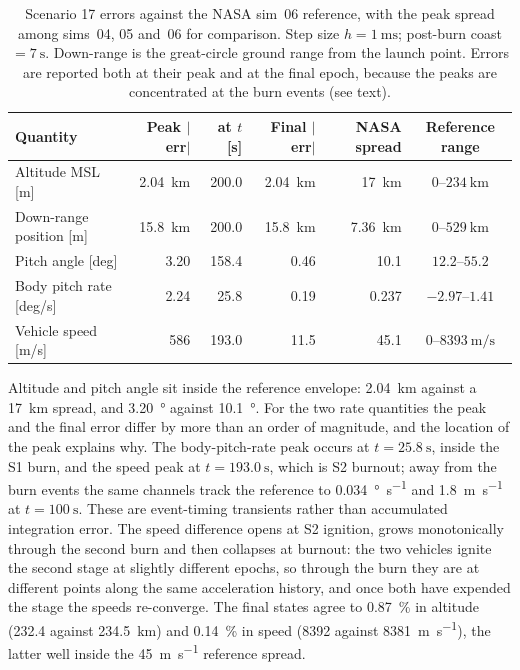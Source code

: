 \documentclass[a4paper,10pt]{article}
\theoremstyle{definition}
\begin{document}
\begin{table}[h]
  \centering
  \caption{Scenario 17 errors against the NASA sim~06 reference, with the peak
    spread among sims~04, 05 and~06 for comparison.  Step size
    $h = \SI{1}{\milli\second}$; post-burn coast $= \SI{7}{\second}$.  Down-range
    is the great-circle ground range from the launch point.  Errors are
    reported both at their peak and at the final epoch, because the peaks are
    concentrated at the burn events (see text).}
  \label{tab:scenario17_errors}
  \small
  \begin{tabular}{lrrrrc}
    \toprule
    Quantity & Peak $\lvert$err$\rvert$ & at $t$ [s] & Final $\lvert$err$\rvert$
      & NASA spread & Reference range \\
    \midrule
    Altitude MSL [m]        & \SI{2.04}{\kilo\metre} & 200.0 & \SI{2.04}{\kilo\metre} & \SI{17}{\kilo\metre}   & $0$--$\SI{234}{\kilo\metre}$ \\
    Down-range position [m] & \SI{15.8}{\kilo\metre} & 200.0 & \SI{15.8}{\kilo\metre} & \SI{7.36}{\kilo\metre} & $0$--$\SI{529}{\kilo\metre}$ \\
    Pitch angle [deg]       & 3.20                   & 158.4 & 0.46                   & 10.1                   & $12.2$--$55.2$ \\
    Body pitch rate [deg/s] & 2.24                   &  25.8 & 0.19                   & 0.237                  & $-2.97$--$1.41$ \\
    Vehicle speed [m/s]     & 586                    & 193.0 & 11.5                   & 45.1                   & $0$--$\SI{8393}{\metre\per\second}$ \\
    \bottomrule
  \end{tabular}
\end{table}

Altitude and pitch angle sit inside the reference envelope: \SI{2.04}{\kilo\metre}
against a \SI{17}{\kilo\metre} spread, and \SI{3.20}{\degree} against
\SI{10.1}{\degree}.  For the two rate quantities the peak and the final error
differ by more than an order of magnitude, and the location of the peak
explains why.  The body-pitch-rate peak occurs at $t = \SI{25.8}{\second}$,
inside the S1 burn, and the speed peak at $t = \SI{193.0}{\second}$, which is
S2 burnout; away from the burn events the same channels track the reference to
\SI{0.034}{\degree\per\second} and \SI{1.8}{\metre\per\second} at
$t = \SI{100}{\second}$.  These are event-timing transients rather than
accumulated integration error.  The speed difference opens at S2 ignition, grows
monotonically through the second burn and then collapses at burnout: the two
vehicles ignite the second stage at slightly different epochs, so through the
burn they are at different points along the same acceleration history, and once
both have expended the stage the speeds re-converge.  The final states
agree to \SI{0.87}{\percent} in altitude (\SI{232.4}{} against
\SI{234.5}{\kilo\metre}) and \SI{0.14}{\percent} in speed
(\SI{8392}{} against \SI{8381}{\metre\per\second}), the latter well inside the
\SI{45}{\metre\per\second} reference spread.
\end{document}

